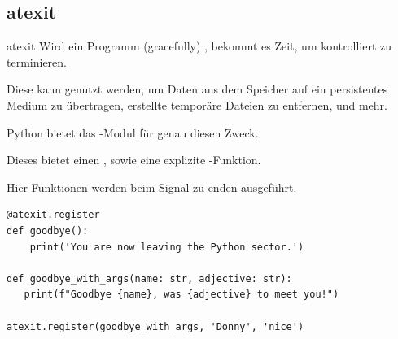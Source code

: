 \documentclass[12pt, aspectratio=169, usepdftitle=false]{beamer}
\newcommand{\pp}[1]{\lpl{#1}}
\begin{document}
\subsection{atexit}
\begin{frame}[fragile]{atexit}
        Wird ein Programm (gracefully) , bekommt es Zeit, um kontrolliert zu terminieren.

		\medskip
		
		Diese  kann genutzt werden, um Daten aus dem Speicher auf ein persistentes Medium zu übertragen, erstellte temporäre Dateien zu entfernen, und mehr.
		
		\medskip
		
		Python bietet das \pp{atexit}-Modul für genau diesen Zweck.
		
		\medskip
		
		Dieses bietet einen , sowie eine explizite \pp{register}-Funktion.
		
		\medskip
		
		Hier  Funktionen werden beim Signal zu enden ausgeführt.
		
		\medskip

 \begin{lstlisting}[language=pytiny]
@atexit.register
def goodbye():
    print('You are now leaving the Python sector.')	

def goodbye_with_args(name: str, adjective: str):
   print(f"Goodbye {name}, was {adjective} to meet you!")

atexit.register(goodbye_with_args, 'Donny', 'nice')
	\end{lstlisting}
\end{frame}




	
	
	
\end{document}
